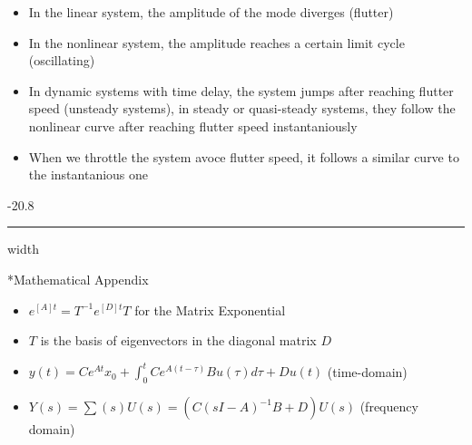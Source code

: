 \documentclass[8pt, landscape, fleqn]{scrartcl}
\makeatletter
\renewcommand{\subsubsection}{\@startsection{subsubsection}{1}{0mm}%
{-2\baselineskip}{0.8\baselineskip}%
{\hrule depth 0.2pt width\columnwidth\vspace*{1.2em}\normalsize\bfseries\rmfamily}}
\makeatother
\begin{document}
\begin{multicols*}{3}
\begin{itemize}
        \item In the linear system, the amplitude of the mode diverges (flutter)
        \item In the nonlinear system, the amplitude reaches a certain limit cycle (oscillating)
        \item In dynamic systems with time delay, the system jumps after reaching flutter speed (unsteady systems), in steady or quasi-steady systems, they follow the nonlinear curve after reaching flutter speed instantaniously
        \item When we throttle the system avoce flutter speed, it follows a similar curve to the instantanious one 
    \end{itemize}

 \subsubsection*{Mathematical Appendix}

    \begin{itemize}
        \item $e^{[A]t} = T^{-1} e^{[D]t} T$ for the Matrix Exponential
        \item $T$ is the basis of eigenvectors in the diagonal matrix $D$
        \item $y(t) = C e^{At}x_0+ \int_0^t C e^{A(t-\tau)}Bu(\tau)d\tau + D u(t)$ (time-domain)
        \item $Y(s) = \sum(s)U(s) = (C(sI-A)^{-1}B+D)U(s)$ (frequency domain)
    \end{itemize}

\end{multicols*}
\end{document}
